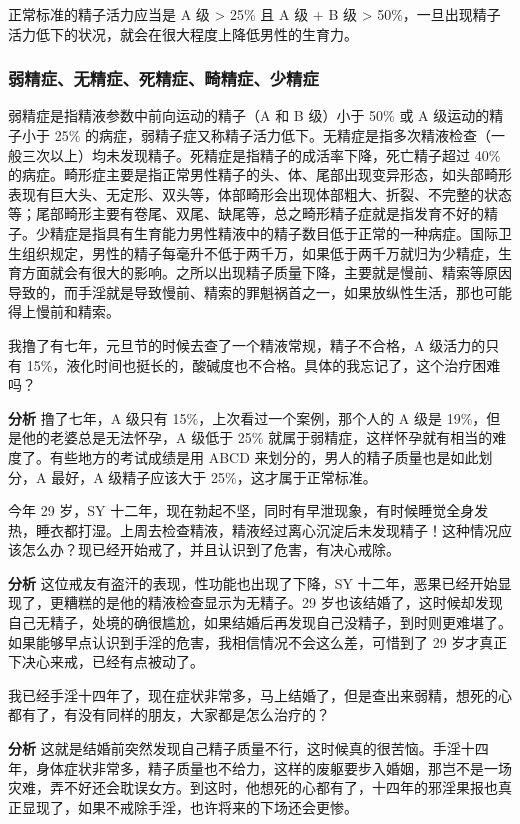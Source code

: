 正常标准的精子活力应当是 A 级 > 25\% 且 A 级 + B 级 > 50\%，一旦出现精子活力低下的状况，就会在很大程度上降低男性的生育力。

\subsubsection{弱精症、无精症、死精症、畸精症、少精症}

弱精症是指精液参数中前向运动的精子（A 和 B 级）小于 50\% 或 A 级运动的精子小于 25\% 的病症，弱精子症又称精子活力低下。无精症是指多次精液检查（一般三次以上）均未发现精子。死精症是指精子的成活率下降，死亡精子超过 40\% 的病症。畸形症主要是指正常男性精子的头、体、尾部出现变异形态，如头部畸形表现有巨大头、无定形、双头等，体部畸形会出现体部粗大、折裂、不完整的状态等；尾部畸形主要有卷尾、双尾、缺尾等，总之畸形精子症就是指发育不好的精子。少精症是指具有生育能力男性精液中的精子数目低于正常的一种病症。国际卫生组织规定，男性的精子每毫升不低于两千万，如果低于两千万就归为少精症，生育方面就会有很大的影响。之所以出现精子质量下降，主要就是慢前、精索等原因导致的，而手淫就是导致慢前、精索的罪魁祸首之一，如果放纵性生活，那也可能得上慢前和精索。

\begin{case}[不孕不育]
    我撸了有七年，元旦节的时候去查了一个精液常规，精子不合格，A 级活力的只有 15\%，液化时间也挺长的，酸碱度也不合格。具体的我忘记了，这个治疗困难吗？

    \textbf{分析} 撸了七年，A 级只有 15\%，上次看过一个案例，那个人的 A 级是 19\%，但是他的老婆总是无法怀孕，A 级低于 25\% 就属于弱精症，这样怀孕就有相当的难度了。有些地方的考试成绩是用 ABCD 来划分的，男人的精子质量也是如此划分，A 最好，A 级精子应该大于 25\%，这才属于正常标准。
\end{case}

\begin{case}[不孕不育]
    今年 29 岁，SY 十二年，现在勃起不坚，同时有早泄现象，有时候睡觉全身发热，睡衣都打湿。上周去检查精液，精液经过离心沉淀后未发现精子！这种情况应该怎么办？现已经开始戒了，并且认识到了危害，有决心戒除。

    \textbf{分析} 这位戒友有盗汗的表现，性功能也出现了下降，SY 十二年，恶果已经开始显现了，更糟糕的是他的精液检查显示为无精子。29 岁也该结婚了，这时候却发现自己无精子，处境的确很尴尬，如果结婚后再发现自己没精子，到时则更难堪了。如果能够早点认识到手淫的危害，我相信情况不会这么差，可惜到了 29 岁才真正下决心来戒，已经有点被动了。
\end{case}

\begin{case}[不孕不育]
    我已经手淫十四年了，现在症状非常多，马上结婚了，但是查出来弱精，想死的心都有了，有没有同样的朋友，大家都是怎么治疗的？

    \textbf{分析} 这就是结婚前突然发现自己精子质量不行，这时候真的很苦恼。手淫十四年，身体症状非常多，精子质量也不给力，这样的废躯要步入婚姻，那岂不是一场灾难，弄不好还会耽误女方。到这时，他想死的心都有了，十四年的邪淫果报也真正显现了，如果不戒除手淫，也许将来的下场还会更惨。
\end{case}

